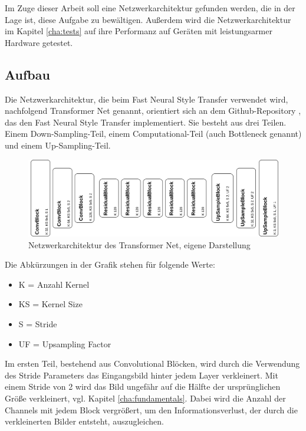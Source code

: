Im Zuge dieser Arbeit soll eine Netzwerkarchitektur gefunden werden, die in der Lage ist, diese Aufgabe zu bewältigen. Außerdem wird die Netzwerkarchitektur im Kapitel \ref{cha:tests} auf ihre Performanz auf Geräten mit leistungsarmer Hardware getestet.

\subsection{Aufbau}
\label{sec:aufbau}

Die Netzwerkarchitektur, die beim Fast Neural Style Transfer verwendet wird, nachfolgend Transformer Net genannt, orientiert sich an dem Github-Repository \cite{PyTorchFastNeuralStyle}, das den Fast Neural Style Transfer implementiert.
Sie besteht aus drei Teilen. Einem Down-Sampling-Teil, einem Computational-Teil (auch Bottleneck genannt) und einem Up-Sampling-Teil.

\begin{figure}[H]
	\centering
	\includegraphics[width=1.0\textwidth]{resources/content/transformer_net.png}
	\caption{Netzwerkarchitektur des Transformer Net, eigene Darstellung}
	\label{img:transformer_net_img}
\end{figure}

Die Abkürzungen in der Grafik stehen für folgende Werte:

\begin{itemize}
	\item K = Anzahl Kernel
	\item KS = Kernel Size
	\item S = Stride
	\item UF = Upsampling Factor
\end{itemize}

Im ersten Teil, bestehend aus Convolutional Blöcken, wird durch die Verwendung des Stride Parameters das Eingangsbild hinter jedem Layer verkleinert. Mit einem Stride von 2 wird das Bild ungefähr auf die Hälfte der ursprünglichen Größe verkleinert, vgl. Kapitel \ref{cha:fundamentals}. Dabei wird die Anzahl der Channels mit jedem Block vergrößert, um den Informationsverlust, der durch die verkleinerten Bilder entsteht, auszugleichen.

